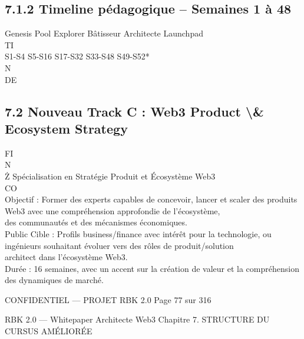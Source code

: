 \documentclass[12pt,landscape,a4paper]{article}
\newenvironment{confidential}
{\begin{tcolorbox}[
    colback=rbkred!5!white,
    colframe=rbkred!75!black,
    title=CONFIDENTIEL,
    fonttitle=\bfseries\color{white},
    coltitle=rbkred!75!black,
    breakable,
    enhanced,
    frame hidden,
    borderline west={2pt}{0pt}{rbkred!75!black}
]}
{\end{tcolorbox}}
\begin{document}
\subsection{7.1.2 Timeline pédagogique – Semaines 1 à 48}
\vspace{0.5em}
Genesis Pool        Explorer          Bâtisseur         Architecte         Launchpad\\
\vspace{0.5em}
\vspace{0.5em}
\vspace{0.5em}
\vspace{0.5em}
TI\\
S1-S4             S5-S16            S17-S32           S33-S48            S49-S52*\\
\vspace{0.5em}
\vspace{0.5em}
\vspace{0.5em}
\vspace{0.5em}
N\\
DE\\
\subsection{7.2 Nouveau Track C : Web3 Product \textbackslash{}& Ecosystem Strategy}
\vspace{0.5em}
\vspace{0.5em}
\vspace{0.5em}
FI\\
N\\
Ż Spécialisation en Stratégie Produit et Écosystème Web3\\
CO\\
Objectif : Former des experts capables de concevoir, lancer et scaler des produits Web3 avec une compréhension approfondie de l’écosystème,\\
des communautés et des mécanismes économiques.\\
Public Cible : Profils business/finance avec intérêt pour la technologie, ou ingénieurs souhaitant évoluer vers des rôles de produit/solution\\
architect dans l’écosystème Web3.\\
Durée : 16 semaines, avec un accent sur la création de valeur et la compréhension des dynamiques de marché.\\
\vspace{0.5em}
\vspace{0.5em}
\vspace{0.5em}
\vspace{0.5em}
\begin{confidential}CONFIDENTIEL — PROJET RBK 2.0                                   Page 77 sur 316\end{confidential}
RBK 2.0 — Whitepaper Architecte Web3                                                                    Chapitre 7. STRUCTURE DU CURSUS AMÉLIORÉE\\
\vspace{0.5em}
\vspace{0.5em}
\end{document}
